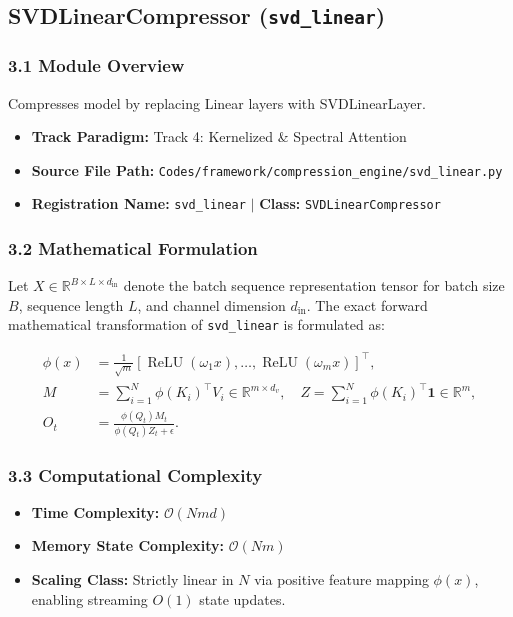 \subsection{SVDLinearCompressor (\texttt{svd\_linear})}
\label{sec:app_module_svd\_linear}

\subsubsection*{3.1 Module Overview}
Compresses model by replacing Linear layers with SVDLinearLayer.
\begin{itemize}
    \item \textbf{Track Paradigm:} Track 4: Kernelized & Spectral Attention
    \item \textbf{Source File Path:} \texttt{Codes/framework/compression\_engine/svd\_linear.py}
    \item \textbf{Registration Name:} \texttt{svd\_linear} $\mid$ \textbf{Class:} \texttt{SVDLinearCompressor}
\end{itemize}

\subsubsection*{3.2 Mathematical Formulation}
Let $X \in \mathbb{R}^{B \times L \times d_{\text{in}}}$ denote the batch sequence representation tensor for batch size $B$, sequence length $L$, and channel dimension $d_{\text{in}}$. The exact forward mathematical transformation of \texttt{svd\_linear} is formulated as:

\begin{align}
\phi(x) &= \frac{1}{\sqrt{m}} \left[ \operatorname{ReLU}(\omega_1 x), \dots, \operatorname{ReLU}(\omega_m x) \right]^\top, \\
M &= \sum_{i=1}^N \phi(K_i)^\top V_i \in \mathbb{R}^{m \times d_v}, \quad Z = \sum_{i=1}^N \phi(K_i)^\top \mathbf{1} \in \mathbb{R}^m, \\
O_t &= \frac{\phi(Q_t) M_t}{\phi(Q_t) Z_t + \epsilon}.
\end{align}


\subsubsection*{3.3 Computational Complexity}
\begin{itemize}
    \item \textbf{Time Complexity:} $\mathcal{O}(N m d)$
    \item \textbf{Memory State Complexity:} $\mathcal{O}(N m)$
    \item \textbf{Scaling Class:} Strictly linear in $N$ via positive feature mapping $\phi(x)$, enabling streaming $O(1)$ state updates.
\end{itemize}

